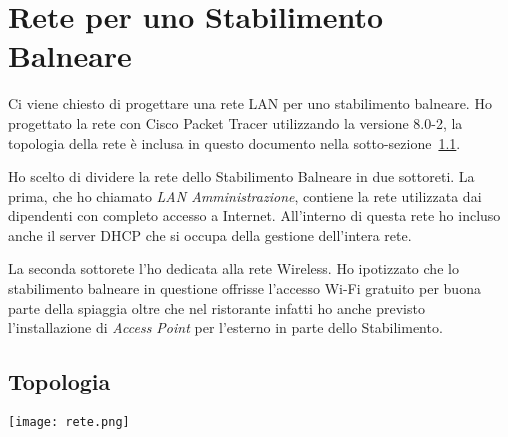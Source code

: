\section{Rete per uno Stabilimento Balneare}%
\label{sec:rete}

Ci viene chiesto di progettare una rete LAN per uno stabilimento balneare. Ho progettato la rete con Cisco Packet Tracer utilizzando la versione 8.0-2, la topologia della rete \`e inclusa in questo documento nella sotto-sezione~\ref{sub:topologia}.

Ho scelto di dividere la rete dello Stabilimento Balneare in due sottoreti. La prima, che ho chiamato \emph{LAN Amministrazione}, contiene la rete utilizzata dai dipendenti con completo accesso a Internet. All'interno di questa rete ho incluso anche il server DHCP che si occupa della gestione dell'intera rete.

La seconda sottorete l'ho dedicata alla rete Wireless. Ho ipotizzato che lo stabilimento balneare in questione offrisse l'accesso Wi-Fi gratuito per buona parte della spiaggia oltre che nel ristorante infatti ho anche previsto l'installazione di \emph{Access Point} per l'esterno in parte dello Stabilimento.







\begin{landscape}
    \subsection{Topologia}%
    \label{sub:topologia}
    \thispagestyle{empty}
    \texttt{[image: rete.png]}
\end{landscape}